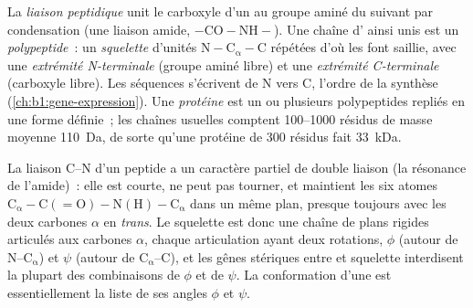 \begin{definition}\label{def:b1:proteins:peptide}
La \emph{liaison peptidique} unit le carboxyle
d'un  au groupe aminé du suivant par condensation (une
liaison amide, $\mathrm{-CO{-}NH-}$). Une chaîne d' ainsi
unis est un \emph{polypeptide}~: un \emph{squelette}
d'unités $\mathrm{N{-}C_\alpha{-}C}$ répétées d'où les 
font saillie, avec une \emph{extrémité N-terminale} (groupe aminé libre)
et une \emph{extrémité C-terminale} (carboxyle libre). Les séquences
s'écrivent de N vers C, l'ordre de la synthèse
(\cref{ch:b1:gene-expression}). Une \emph{protéine} est
un ou plusieurs polypeptides repliés en une forme définie~; les chaînes
usuelles comptent \qtyrange{100}{1000}{} résidus de masse moyenne
\qty{110}{Da}, de sorte qu'une protéine de \qty{300}{} résidus fait
\qty{33}{kDa}.
\end{definition}

\begin{proposition}\label{prop:b1:proteins:geometry}
La liaison C--N d'un peptide a un caractère partiel de double liaison
(la résonance de l'amide)~: elle est courte, ne peut pas tourner, et
maintient les six atomes
$\mathrm{C_\alpha{-}C(=O){-}N(H){-}C_\alpha}$ dans un même plan, presque
toujours avec les deux carbones $\alpha$ en \emph{trans}. Le squelette
est donc une chaîne de plans rigides articulés aux carbones $\alpha$,
chaque articulation ayant deux rotations, $\phi$ (autour de
N--$\mathrm{C_\alpha}$) et $\psi$ (autour de $\mathrm{C_\alpha}$--C), et
les gênes stériques entre  et squelette interdisent la
plupart des combinaisons de $\phi$ et de $\psi$. La conformation d'une
 est essentiellement la liste de ses angles $\phi$ et $\psi$.
\end{proposition}

